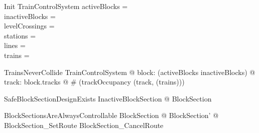 \begin{schema}{Init}
  TrainControlSystem
\where
  activeBlocks = \emptyset\\
  inactiveBlocks = \emptyset\\
  levelCrossings = \emptyset\\
  stations = \emptyset\\
  lines = \emptyset\\
  trains = \emptyset
\end{schema}

\begin{theorem}{TrainsNeverCollide}
\forall  TrainControlSystem @ \forall  block: \ran  (activeBlocks \cup  inactiveBlocks) @ \forall  track: block.tracks @ \# (trackOccupancy (track, (\ran  trains))) 
\end{theorem}

\begin{theorem}{SafeBlockSectionDesignExists}
\exists  InactiveBlockSection @ BlockSection
\end{theorem}

\begin{theorem}{BlockSectionsAreAlwaysControllable}
\forall  BlockSection @ \exists  BlockSection' @ BlockSection\_SetRoute \lor  BlockSection\_CancelRoute
\end{theorem}

